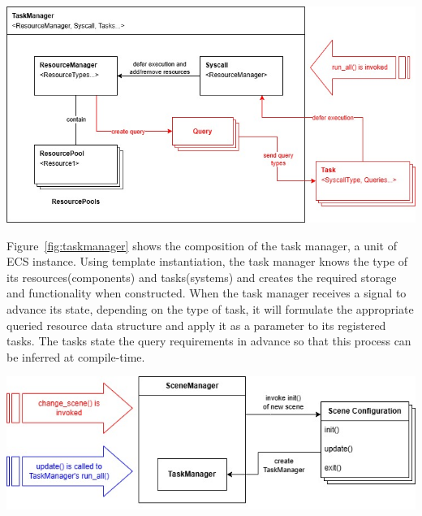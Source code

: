 \noindent
\begin{minipage}{\columnwidth}
    \centering
    \includegraphics[width=\columnwidth, keepaspectratio]{images/taskmanager}
    \label{fig:taskmanager}
\end{minipage}

\vspace{0.5cm}

\noindent Figure~\ref{fig:taskmanager} shows the composition of the task manager, a unit of ECS instance.
Using template instantiation, the task manager knows the type of its resources(components) and tasks(systems)
and creates the required storage and functionality when constructed.
When the task manager receives a signal to advance its state, depending on the type of task, it will
formulate the appropriate queried resource data structure and apply it as a parameter to its registered tasks.
The tasks state the query requirements in advance so that this process can be inferred at compile-time.

\vspace{0.5cm}

\noindent
\begin{minipage}{\columnwidth}
    \centering
    \includegraphics[width=\columnwidth, keepaspectratio]{images/scenemanager}
    \label{fig:scenemanager}
\end{minipage}

